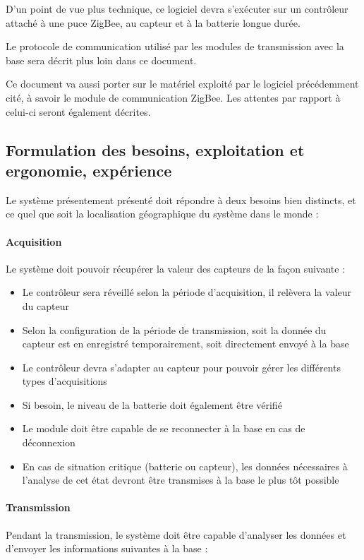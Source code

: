 D'un point de vue plus technique, ce logiciel devra s'exécuter sur un contrôleur attaché à une puce ZigBee, au capteur et à la batterie longue durée.

Le protocole de communication utilisé par les modules de transmission avec la base sera décrit plus loin dans ce document.

Ce document va aussi porter sur le matériel exploité par le logiciel précédemment cité, à savoir le module de communication ZigBee. Les attentes par rapport à celui-ci seront également décrites.

\subsection{Formulation des besoins, exploitation et ergonomie, expérience}

Le système présentement présenté doit répondre à deux besoins bien distincts, et ce quel que soit la localisation géographique du système dans le monde :

\paragraph{Acquisition} Le système doit pouvoir récupérer la valeur des capteurs de la façon suivante :

\begin{itemize}
\item Le contrôleur sera réveillé selon la période d'acquisition, il relèvera la valeur du capteur 
\item Selon la configuration de la période de transmission, soit la donnée du capteur est en enregistré temporairement, soit directement envoyé à la base
\item Le contrôleur devra s'adapter au capteur pour pouvoir gérer les différents types d'acquisitions
\item Si besoin, le niveau de la batterie doit également être vérifié
\item Le module doit être capable de se reconnecter à la base en cas de déconnexion
\item En cas de situation critique (batterie ou capteur), les données nécessaires à l'analyse de cet état devront être transmises à la base le plus tôt possible
\end{itemize}

\paragraph{Transmission} Pendant la transmission, le système doit être capable d'analyser les données et d'envoyer les informations suivantes à la base :

